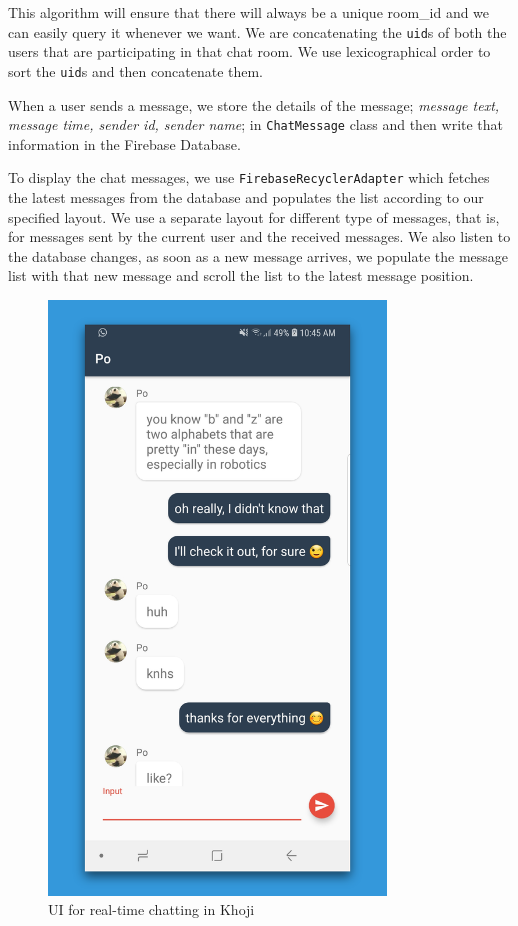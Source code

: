 This algorithm will ensure that there will always be a unique room\_id and we can easily query it whenever we want. We are concatenating the \texttt{uid}s of both the users that are participating in that chat room. We use lexicographical order to sort the \texttt{uid}s and then concatenate them.

When a user sends a message, we store the details of the message; \textit{message text, message time, sender id, sender name}; in \texttt{ChatMessage} class and then write that information in the Firebase Database.

To display the chat messages, we use \texttt{FirebaseRecyclerAdapter} which fetches the latest messages from the database and populates the list according to our specified layout. We use a separate layout for different type of messages, that is, for messages sent by the current user and the received messages. We also listen to the database changes, as soon as a new message arrives, we populate the message list with that new message and scroll the list to the latest message position.

\begin{figure}[H]
	\centering
		\includegraphics[width=0.80\textwidth]{images/khoji_chat.png}
	\caption{UI for real-time chatting in Khoji}
	\label{fig:khoji_chat}
\end{figure}


